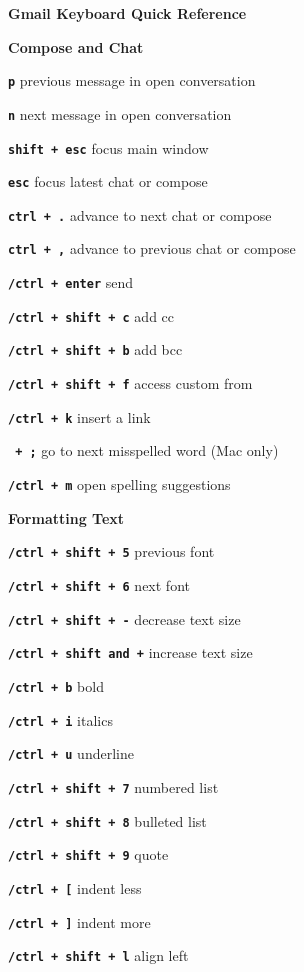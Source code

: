 \documentclass[11pt,letterpaper]{article}
\newcommand{\sck}[1]{\textbf{\texttt{#1}}}
\newcommand{\hdr}[1]{\vspace{1em}\textbf{\textsf \large #1}\vspace{0.5em}}
\begin{document}
\begin{center}
\textbf{\Large Gmail Keyboard Quick Reference}
\end{center}


\hdr{Compose and Chat}

\sck{p} \dotfill previous message in open conversation

\sck{n} \dotfill next message in open conversation

\sck{shift + esc} \dotfill focus main window

\sck{esc} \dotfill focus latest chat or compose

\sck{ctrl + .} \dotfill advance to next chat or compose

\sck{ctrl + ,} \dotfill advance to previous chat or compose

\sck{\cmd /ctrl + enter} \dotfill send

\sck{\cmd/ctrl + shift + c} \dotfill add cc

\sck{\cmd/ctrl + shift + b} \dotfill add bcc

\sck{\cmd/ctrl + shift + f} \dotfill access custom from

\sck{\cmd/ctrl + k} \dotfill insert a link

\sck{\cmd\ + ;} \dotfill go to next misspelled word (Mac only)

\sck{\cmd/ctrl + m} \dotfill open spelling suggestions

\hdr{Formatting Text}

\sck{\cmd/ctrl + shift + 5} \dotfill previous font

\sck{\cmd/ctrl + shift + 6} \dotfill next font

\sck{\cmd/ctrl + shift + -} \dotfill decrease text size

\sck{\cmd/ctrl + shift and +} \dotfill increase text size

\sck{\cmd/ctrl + b} \dotfill bold

\sck{\cmd/ctrl + i} \dotfill italics

\sck{\cmd/ctrl + u} \dotfill underline

\sck{\cmd/ctrl + shift + 7} \dotfill numbered list

\sck{\cmd/ctrl + shift + 8} \dotfill bulleted list

\sck{\cmd/ctrl + shift + 9} \dotfill quote

\sck{\cmd/ctrl + [} \dotfill indent less

\sck{\cmd/ctrl + ]} \dotfill indent more

\sck{\cmd/ctrl + shift + l} \dotfill align left
\end{document}
